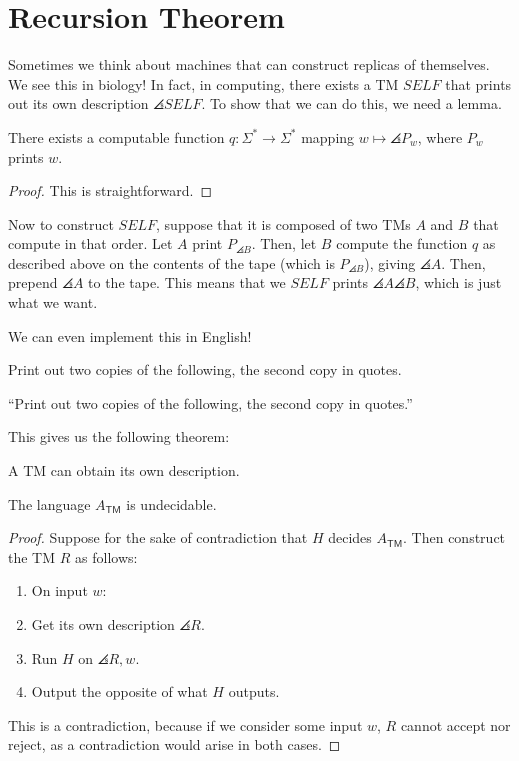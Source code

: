 \documentclass{standalone}
\begin{document}
\section{Recursion Theorem}
Sometimes we think about machines that can construct replicas of themselves. We see this in biology! In fact, in computing, there exists a \textsf{TM} \(\mathit{SELF}\) that prints out its own description \(\angles{\textit{SELF}}\).  To show that we can do this, we need a lemma.

\begin{lemma}
	There exists a computable function \(q \colon \Sigma^* \to \Sigma^*\) mapping \(w \mapsto \angles{P_w}\), where \(P_w\) prints \(w\).
\end{lemma}
\begin{proof}
	This is straightforward.
\end{proof}

Now to construct \(\mathit{SELF}\), suppose that it is composed of two \textsf{TM}s \(A\) and \(B\) that compute in that order. Let \(A\) print \(P_{\angles B}\). Then, let \(B\) compute the function \(q\) as described above on the contents of the tape (which is \(P_{\angles B}\)), giving \(\angles A\). Then, prepend \(\angles A\) to the tape. This means that we \(\mathit{SELF}\) prints \(\angles A \angles B\), which is just what we want.

We can even implement this in English!
\begin{algorithm*}
	Print out two copies of the following, the second copy in quotes.

	``Print out two copies of the following, the second copy in quotes.''
\end{algorithm*}

This gives us the following theorem:
\begin{theorem}
	A \textsf{TM} can obtain its own description.
\end{theorem}

\begin{corollary}
	The language \(A_{\textsf{TM}}\) is undecidable.
\end{corollary}
\begin{proof}
	Suppose for the sake of contradiction that \(H\) decides \(A_{\textsf{TM}}\). Then construct the \textsf{TM} \(R\) as follows:
	\begin{enumerate}[start=0]
		\item On input \(w\):
		\item Get its own description \(\angles{R}\).
		\item Run \(H\) on \(\angles{R, w}\).
		\item Output the opposite of what \(H\) outputs.
	\end{enumerate}
	
	This is a contradiction, because if we consider some input \(w\), \(R\) cannot accept nor reject, as a contradiction would arise in both cases.
\end{proof}
\end{document}
